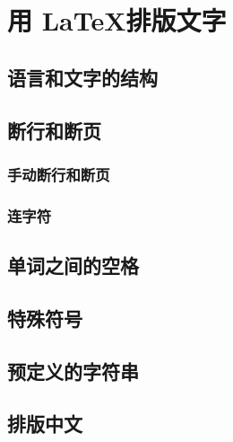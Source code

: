 \chapter{用 \LaTeX 排版文字}

\leavevmode\nobreakspace

\section{语言和文字的结构}

\leavevmode\nobreakspace

\section{断行和断页}

\leavevmode\nobreakspace

\subsection{手动断行和断页}

\leavevmode\nobreakspace

\subsection{连字符}

\leavevmode\nobreakspace

\section{单词之间的空格}

\leavevmode\nobreakspace

\section{特殊符号}

\leavevmode\nobreakspace

\section{预定义的字符串}

\leavevmode\nobreakspace

\section{排版中文}

\leavevmode\nobreakspace

\endinput